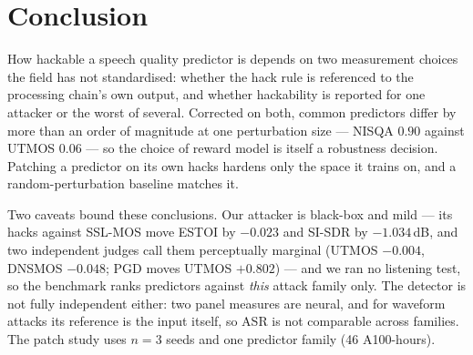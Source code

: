 \documentclass[conference]{IEEEtran}
\begin{document}
\section{Conclusion}
How hackable a speech quality predictor is depends on two measurement choices the field has not standardised:
whether the hack rule is referenced to the processing chain's own output, and whether hackability is reported for
one attacker or the worst of several. Corrected on both, common predictors differ by more than an order of
magnitude at one perturbation size --- NISQA $0.90$ against UTMOS $0.06$ --- so the choice of reward model is
itself a robustness decision. Patching a predictor on its own hacks hardens only the space it trains on, and a
random-perturbation baseline matches it.

Two caveats bound these conclusions. Our attacker is black-box and mild --- its hacks against SSL-MOS move
ESTOI by $-0.023$ and SI-SDR by $-1.034$\,dB, and two independent judges call them perceptually marginal (UTMOS
$-0.004$, DNSMOS $-0.048$; PGD moves UTMOS $+0.802$) --- and we ran no listening test, so the
benchmark ranks predictors against \emph{this} attack family only. The detector is not fully independent either:
two panel measures are neural, and for waveform attacks its reference is the input itself, so ASR is not
comparable across families. The patch study uses $n=3$ seeds and one predictor family (46 A100-hours).



\end{document}
